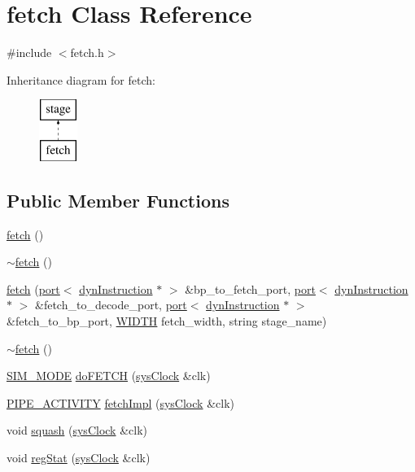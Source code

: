 \hypertarget{classfetch}{
\section{fetch Class Reference}
\label{classfetch}
}


{\ttfamily \#include $<$fetch.h$>$}

Inheritance diagram for fetch:\begin{figure}[H]
\begin{center}
\leavevmode
\includegraphics[height=2.000000cm]{classfetch}
\end{center}
\end{figure}
\subsection*{Public Member Functions}
\begin{DoxyCompactItemize}
\item 
\hyperlink{classfetch_ac35d86b42890d4facb56666a58548a8d}{fetch} ()
\item 
\hyperlink{classfetch_a7bb4278b048d48d4225cb44b6553b3d6}{$\sim$fetch} ()
\item 
\hyperlink{classfetch_ad7f7cc7347c967a7843194684f3c3b21}{fetch} (\hyperlink{classport}{port}$<$ \hyperlink{classdynInstruction}{dynInstruction} $\ast$ $>$ \&bp\_\-to\_\-fetch\_\-port, \hyperlink{classport}{port}$<$ \hyperlink{classdynInstruction}{dynInstruction} $\ast$ $>$ \&fetch\_\-to\_\-decode\_\-port, \hyperlink{classport}{port}$<$ \hyperlink{classdynInstruction}{dynInstruction} $\ast$ $>$ \&fetch\_\-to\_\-bp\_\-port, \hyperlink{global_2global_8h_a6fa2e24b8a418fa215e183264cbea3aa}{WIDTH} fetch\_\-width, string stage\_\-name)
\item 
\hyperlink{classfetch_a7bb4278b048d48d4225cb44b6553b3d6}{$\sim$fetch} ()
\item 
\hyperlink{unit_2stage_8h_ac68af0001af4b7049b2435ded74c4e5e}{SIM\_\-MODE} \hyperlink{classfetch_abe2124748be0ac8b2e2b516203f9b194}{doFETCH} (\hyperlink{classsysClock}{sysClock} \&clk)
\item 
\hyperlink{unit_2stage_8h_ab00e4188e8b8974fecb1dfd12764cbb1}{PIPE\_\-ACTIVITY} \hyperlink{classfetch_af1aaa5a5c78172ec27dae140c7dc3ab3}{fetchImpl} (\hyperlink{classsysClock}{sysClock} \&clk)
\item 
void \hyperlink{classfetch_a39b22ed50d3b51ebe311be86343fed2a}{squash} (\hyperlink{classsysClock}{sysClock} \&clk)
\item 
void \hyperlink{classfetch_afd8c8e8e16f0f288d1090d59a85c2281}{regStat} (\hyperlink{classsysClock}{sysClock} \&clk)
\end{DoxyCompactItemize}


